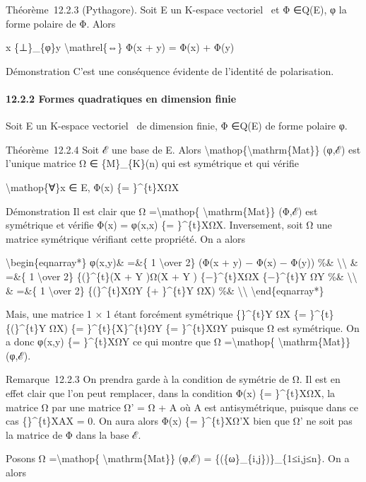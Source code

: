 \documentclass[]{article}
\begin{document}
Théorème~12.2.3 (Pythagore). Soit E un K-espace vectoriel ~et Φ ∈Q(E), φ
la forme polaire de Φ. Alors

x \{⊥\}\_\{φ\}y \textbackslash{}mathrel\{⇔\} Φ(x + y) = Φ(x) + Φ(y)

Démonstration C'est une conséquence évidente de l'identité de
polarisation.

\paragraph{12.2.2 Formes quadratiques en dimension finie}

Soit E un K-espace vectoriel ~de dimension finie, Φ ∈Q(E) de forme
polaire φ.

Théorème~12.2.4 Soit ℰ une base de E. Alors
\textbackslash{}mathop\{\textbackslash{}mathrm\{Mat\}\} (φ,ℰ) est
l'unique matrice Ω ∈ \{M\}\_\{K\}(n) qui est symétrique et qui vérifie

\textbackslash{}mathop\{∀\}x ∈ E, Φ(x) \{= \}\^{}\{t\}XΩX

Démonstration Il est clair que Ω =\textbackslash{}mathop\{
\textbackslash{}mathrm\{Mat\}\} (Φ,ℰ) est symétrique et vérifie Φ(x) =
φ(x,x) \{= \}\^{}\{t\}XΩX. Inversement, soit Ω une matrice symétrique
vérifiant cette propriété. On a alors

\textbackslash{}begin\{eqnarray*\} φ(x,y)\& =\&\{ 1 \textbackslash{}over
2\} (Φ(x + y) − Φ(x) − Φ(y)) \%\& \textbackslash{}\textbackslash{} \&
=\&\{ 1 \textbackslash{}over 2\} \{(\}\^{}\{t\}(X + Y )Ω(X + Y )
\{−\}\^{}\{t\}XΩX \{−\}\^{}\{t\}Y ΩY \%\&
\textbackslash{}\textbackslash{} \& =\&\{ 1 \textbackslash{}over 2\}
\{(\}\^{}\{t\}XΩY \{+ \}\^{}\{t\}Y ΩX) \%\&
\textbackslash{}\textbackslash{} \textbackslash{}end\{eqnarray*\}

Mais, une matrice 1 × 1 étant forcément symétrique \{\}\^{}\{t\}Y ΩX \{=
\}\^{}\{t\}\{(\}\^{}\{t\}Y ΩX) \{= \}\^{}\{t\}\{X\}\^{}\{t\}ΩY \{=
\}\^{}\{t\}XΩY puisque Ω est symétrique. On a donc φ(x,y) \{=
\}\^{}\{t\}XΩY ce qui montre que Ω =\textbackslash{}mathop\{
\textbackslash{}mathrm\{Mat\}\} (φ,ℰ).

Remarque~12.2.3 On prendra garde à la condition de symétrie de Ω. Il est
en effet clair que l'on peut remplacer, dans la condition Φ(x) \{=
\}\^{}\{t\}XΩX, la matrice Ω par une matrice Ω' = Ω + A où A est
antisymétrique, puisque dans ce cas \{\}\^{}\{t\}XAX = 0. On aura alors
Φ(x) \{= \}\^{}\{t\}XΩ'X bien que Ω' ne soit pas la matrice de Φ dans la
base ℰ.

Posons Ω =\textbackslash{}mathop\{ \textbackslash{}mathrm\{Mat\}\} (φ,ℰ)
= \{(\{ω\}\_\{i,j\})\}\_\{1≤i,j≤n\}. On a alors
\end{document}
